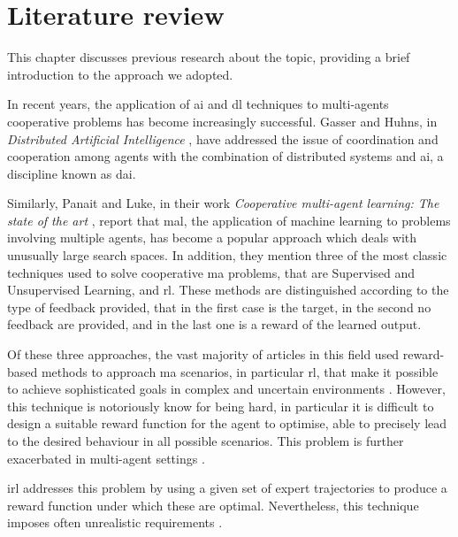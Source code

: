 \chapter{Literature review}
\label{chap:stateoftheart}
This chapter discusses previous research about the topic, providing a brief 
introduction to the approach we adopted.


\bigskip
In recent years, the application of \gls{ai} and \gls{dl} techniques to multi-agents 
cooperative problems has become increasingly successful.
Gasser and Huhns, in \emph{Distributed Artificial Intelligence} 
\cite[][]{gasser2014distributed}, have addressed the issue of coordination and 
cooperation among agents with the combination of distributed systems and 
\gls{ai}, a discipline known as \gls{dai}. 

Similarly, Panait and Luke, in their work \emph{Cooperative multi-agent learning: 
The state of the art} \cite[][]{panait2005cooperative}, report that \gls{mal}, the 
application of machine learning to problems involving multiple agents, has 
become a popular approach which deals with unusually large search spaces. 
In addition, they mention three of the most classic techniques used to solve 
cooperative \gls{ma} problems, that are Supervised and Unsupervised Learning, 
and \gls{rl}. These methods are distinguished according to the type of feedback 
provided, that in the first case is the target, in the second no feedback are 
provided, and in the last one is a reward of the learned output.

Of these three approaches, the vast majority of articles in this field used 
reward-based methods to approach \gls{ma} scenarios, in particular \gls{rl}, that 
make it possible to achieve sophisticated goals in complex and uncertain 
environments \cite[][]{oliehoek2012decentralised}. 
However, this technique is notoriously know for being hard, in particular it is 
difficult to design a suitable reward function for the agent to optimise, able to 
precisely lead to the desired behaviour in all possible scenarios. This problem is 
further exacerbated in multi-agent settings \cite[][]{hadfield2017inverse, 
oliehoek2012decentralised}.

\gls{irl} addresses this problem by using a given set of expert trajectories to 
produce a reward function under which these are optimal. 
Nevertheless, this technique imposes often unrealistic requirements 
\cite[][]{vsovsic2016inverse}.

